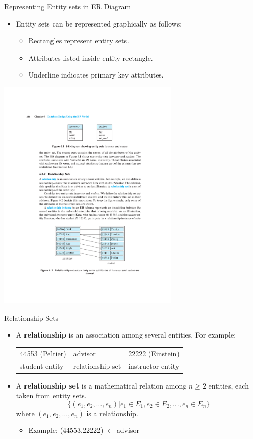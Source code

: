 \documentclass{beamer}
\begin{document}
\begin{frame}{Representing Entity sets in ER Diagram}
    \begin{itemize}
        \item Entity sets can be represented graphically as follows:
        \begin{itemize}
            \item Rectangles represent entity sets.
            \item Attributes listed inside entity rectangle.
            \item Underline indicates primary key attributes.
        \end{itemize}
    \end{itemize}
    \centering
    \includegraphics[trim={8.20cm 21cm 7.65cm 4cm}, clip, width=0.65\textwidth]{figures/p246}
\end{frame}

\begin{frame}{Relationship Sets}
    \begin{itemize}
        \item A \textbf{relationship} is an association among several entities.  For example:
        \begin{tabular}{l l l}
            44553 (Peltier) & advisor          & 22222 (Einstein) \\
            student entity  & relationship set & instructor entity \\
        \end{tabular}
        \item A \textbf{relationship set} is a mathematical relation among $n \geq 2$ entities, each taken from entity sets.
        $$
            \{(e_1, e_2, \ldots, e_n)| e_1 \in E_1, e_2 \in E_2, \ldots, e_n \in E_n\}
        $$
        where $(e_1, e_2, \ldots, e_n)$ is a relationship.
        \begin{itemize}
            \item Example: (44553,22222) $\in$ advisor
        \end{itemize}
    \end{itemize}
\end{frame}
\end{document}
